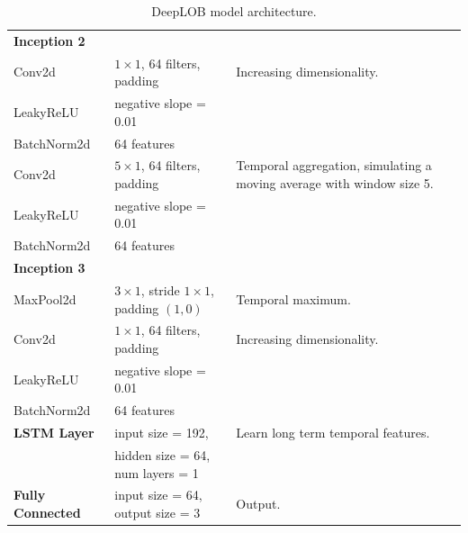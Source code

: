 \documentclass[a4paper, oneside, notitlepage]{book}
\begin{document}
\begin{table}[ht]
{\begin{tabular}{|l|l|l|}
                \hline
                \textbf{Inception 2} & & \\
                \quad Conv2d & $1 \times 1$, 64 filters, padding  & Increasing dimensionality.\\
                \quad LeakyReLU & negative slope = 0.01 & \\
                \quad BatchNorm2d & 64 features & \\
                \quad Conv2d & $5 \times 1$, 64 filters, padding  & Temporal aggregation, simulating a moving average with window size 5.\\
                \quad LeakyReLU & negative slope = 0.01 & \\
                \quad BatchNorm2d & 64 features & \\
                \hline
                \textbf{Inception 3} & & \\
                \quad MaxPool2d & $3 \times 1$, stride $1 \times 1$, padding $(1, 0)$ & Temporal maximum.\\
                \quad Conv2d & $1 \times 1$, 64 filters, padding  & Increasing dimensionality.\\
                \quad LeakyReLU & negative slope = 0.01 & \\
                \quad BatchNorm2d & 64 features & \\
                \hline
                \textbf{LSTM Layer} & input size = 192, & Learn long term temporal features.\\
                                    & hidden size = 64, num layers = 1 & \\
                \hline
                \textbf{Fully Connected} & input size = 64, output size = 3 & Output.\\
                \hline
            \end{tabular}
    }
        \caption{DeepLOB model architecture.}
\end{table}




\clearpage





\end{document}
